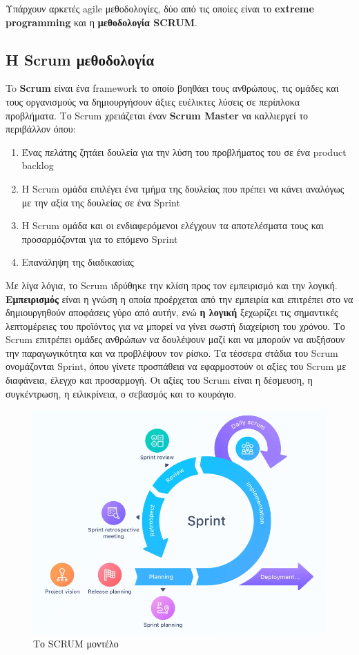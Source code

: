 Υπάρχουν αρκετές agile μεθοδολογίες, δύο από τις οποίες είναι το \textbf{extreme programming} και η \textbf{μεθοδολογία SCRUM}.

\subsection{Η Scrum μεθοδολογία}
\label{chap:scrum}

To \textbf{Scrum} είναι ένα framework το οποίο βοηθάει τους ανθρώπους, τις ομάδες και τους οργανισμούς να δημιουργήσουν άξιες ευέλικτες λύσεις σε περίπλοκα προβλήματα.
Το Scrum χρειάζεται έναν \textbf{Scrum Master} να καλλιεργεί το περιβάλλον όπου:

\begin{enumerate}
  \item Ένας πελάτης ζητάει δουλεία για την λύση του προβλήματος του σε ένα product backlog
  \item Η Scrum ομάδα επιλέγει ένα τμήμα της δουλείας που πρέπει να κάνει αναλόγως με την αξία της δουλείας σε ένα Sprint
  \item Η Scrum ομάδα και οι ενδιαφερόμενοι ελέγχουν τα αποτελέσματα τους και προσαρμόζονται για το επόμενο Sprint
  \item Επανάληψη της διαδικασίας
\end{enumerate}

Με λίγα λόγια, το Scrum ιδρύθηκε την κλίση προς τον εμπειρισμό και την λογική.
\textbf{Εμπειρισμός} είναι η γνώση η οποία προέρχεται από την εμπειρία και επιτρέπει στο να δημιουργηθούν αποφάσεις γύρο από αυτήν, ενώ \textbf{η λογική} ξεχωρίζει τις σημαντικές λεπτομέρειες του προϊόντος για να μπορεί να γίνει σωστή διαχείριση του χρόνου.
Το Scrum επιτρέπει ομάδες ανθρώπων να δουλέψουν μαζί και να μπορούν να αυξήσουν την παραγωγικότητα και να προβλέψουν τον ρίσκο.
Τα τέσσερα στάδια του Scrum ονομάζονται Sprint, όπου γίνετε προσπάθεια να εφαρμοστούν οι αξίες του Scrum με διαφάνεια, έλεγχο και προσαρμογή.
Οι αξίες του Scrum είναι η δέσμευση, η συγκέντρωση, η ειλικρίνεια, ο σεβασμός και το κουράγιο.

\begin{figure}[H]
  \centering
  \includegraphics[width=150mm]{Figures/scrum.png}
  \caption[Το SCRUM μοντέλο]{Το SCRUM μοντέλο}
  \label{fig:scrum}
\end{figure}

